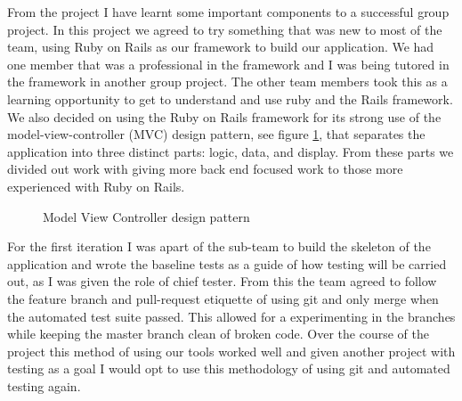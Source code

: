 \documentclass{style/CRPITStyle}
\begin{document}
\vspace{.1in}

From the project I have learnt some important components to a successful group
project. In this project we agreed to try something that was new to most of the
team, using Ruby on Rails as our framework to build our application. We had one
member that was a professional in the framework and I was being tutored in the
framework in another group project. The other team members took this as a
learning opportunity to get to understand and use ruby and the Rails framework.
We also decided on using the Ruby on Rails framework for its strong use of the
model-view-controller (MVC) design pattern, see figure \ref{mvc-pattern}, that
separates the application into three distinct parts: logic, data, and display.
From these parts we divided out work with giving more back end focused work to
those more experienced with Ruby on Rails.

\vspace{.1in}

\begin{figure}[htb]
\caption{\protect\label{mvc-pattern} Model View Controller design pattern }
\end{figure}

\vspace{.1in}

For the first iteration I was apart of the sub-team to build the skeleton of the
application and wrote the baseline tests as a guide of how testing will be
carried out, as I was given the role of chief tester. From this the team agreed
to follow the feature branch and pull-request etiquette of using git and only
merge when the automated test suite passed. This allowed for a experimenting in the
branches while keeping the master branch clean of broken code.
Over the course of the project this method of using our tools worked well and
given another project with testing as a goal I would opt to use this
methodology of using git and automated testing again.
\end{document}
